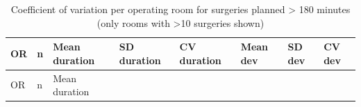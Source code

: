 \documentclass[
]{article}
\begin{document}
\begin{longtable}[]{@{}
  >{\centering\arraybackslash}p{}
  >{\centering\arraybackslash}p{}
  >{\centering\arraybackslash}p{}
  >{\centering\arraybackslash}p{}
  >{\centering\arraybackslash}p{}
  >{\centering\arraybackslash}p{}
  >{\centering\arraybackslash}p{}
  >{\centering\arraybackslash}p{}@{}}
\caption{Coefficient of variation per operating room for surgeries
planned \textgreater{} 180 minutes (only rooms with \textgreater10
surgeries shown) \label{tab:cv_room_over180}}\tabularnewline
\toprule\noalign{}
\begin{minipage}[b]{\linewidth}\centering
OR
\end{minipage} & \begin{minipage}[b]{\linewidth}\centering
n
\end{minipage} & \begin{minipage}[b]{\linewidth}\centering
Mean duration
\end{minipage} & \begin{minipage}[b]{\linewidth}\centering
SD duration
\end{minipage} & \begin{minipage}[b]{\linewidth}\centering
CV duration
\end{minipage} & \begin{minipage}[b]{\linewidth}\centering
Mean dev
\end{minipage} & \begin{minipage}[b]{\linewidth}\centering
SD dev
\end{minipage} & \begin{minipage}[b]{\linewidth}\centering
CV dev
\end{minipage} \\
\midrule\noalign{}
\endfirsthead
\toprule\noalign{}
\begin{minipage}[b]{\linewidth}\centering
OR
\end{minipage} & \begin{minipage}[b]{\linewidth}\centering
n
\end{minipage} & \begin{minipage}[b]{\linewidth}\centering
Mean duration
\end{minipage} & \begin{minipage}[b]{\linewidth}\centering

\end{minipage}
\end{longtable}
\end{document}
